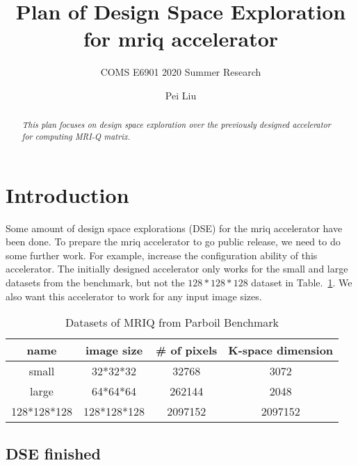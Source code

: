 \documentclass{sig-alternate}
\begin{document}
\title{\Large\bf Plan of Design Space Exploration for mriq accelerator}
\subtitle{\normalsize COMS E6901 2020 Summer Research}

\author{
\alignauthor
Pei Liu\\
\vspace{0.2cm}
}

\vspace{-2cm}

\maketitle

\vspace{-2cm}

\begin{abstract}
{\small\em
  This plan focuses on design space exploration over the previously designed accelerator for computing MRI-Q matrix.
}
\end{abstract}

\section{Introduction}
\label{sec:intro}
Some amount of design space explorations (DSE) for the mriq accelerator have been done. 
To prepare the mriq accelerator to go public release, we need to do some further work. For example, increase the configuration ability of this accelerator. The initially designed accelerator only works for the small and large datasets from the benchmark, but not the $128*128*128$ dataset in Table.~\ref{tab-1}. We also want this accelerator to work for any input image sizes.
\begin{table}[h!]
    \centering
    \begin{tabular}{c|c|c|c}
    \hline
    \hline
       name  & image size & \# of pixels & K-space dimension  \\
        \hline
    \hline
        small  & 32*32*32 & 32768 & 3072 \\
        large & 64*64*64 & 262144 & 2048\\
        128*128*128 & 128*128*128 & 2097152 & 2097152\\
        \hline
        \hline
    \end{tabular}
    \caption{Datasets of MRIQ from Parboil Benchmark}
    \label{tab-1}
\end{table}

\subsection{DSE finished}\label{sec:arch}
\label{sec:milestones}
\end{document}
